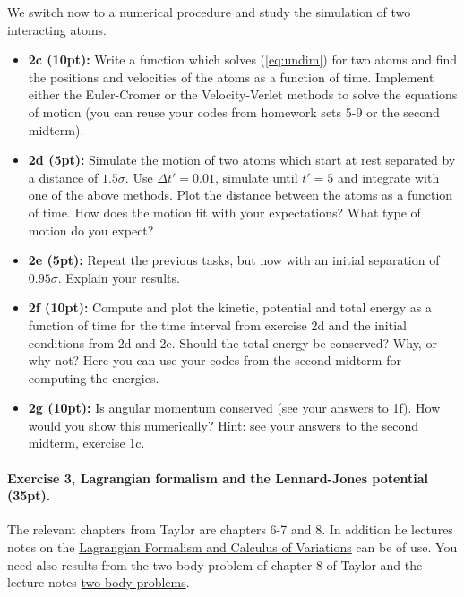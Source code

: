 \documentclass[%
oneside,                 %
final,                   %
10pt]{article}
\begin{document}
\noindent
We switch now to a numerical procedure and study the simulation of two interacting atoms.
\begin{itemize}
\item \textbf{2c (10pt):} Write a function which solves (\ref{eq:undim}) for two atoms and find the positions and velocities of the atoms as a function of time. Implement either the Euler-Cromer or the Velocity-Verlet methods to solve the equations of motion (you can reuse your codes from homework sets 5-9 or the second midterm).

\item \textbf{2d (5pt):} Simulate the motion of two atoms which start at rest separated by a distance of ${1.5}\sigma$. Use $\Delta t'={0.01}$, simulate until $t'=5$ and integrate with one of the above methods. Plot the distance between the atoms as a function of time. How does the motion fit with your expectations? What type of motion do you expect?

\item \textbf{2e (5pt):} Repeat the previous tasks, but now with an initial separation of $0.95\sigma$. Explain your results. 

\item \textbf{2f (10pt):} Compute and plot the kinetic, potential and total energy as a function of time for the time interval from exercise  2d and the initial conditions from 2d and 2e. Should the total energy be conserved? Why, or why not? Here you can use your codes from the second midterm for computing the energies.

\item \textbf{2g (10pt):} Is angular momentum conserved (see your answers to 1f). How would you show this numerically? Hint: see your answers to the second midterm, exercise 1c. 
\end{itemize}

\noindent
\paragraph{Exercise 3, Lagrangian formalism and the Lennard-Jones potential (35pt).}
The relevant chapters from Taylor are chapters 6-7 and 8. In addition he lectures
notes on the \href{{https://mhjensen.github.io/Physics321/doc/LectureNotes/_build/html/chapter8.html}}{Lagrangian Formalism and Calculus of
Variations} can be of use. You
need also results from the two-body problem of chapter 8 of Taylor and
the lecture notes \href{{https://mhjensen.github.io/Physics321/doc/LectureNotes/_build/html/chapter6.html}}{two-body
problems}.
\end{document}

